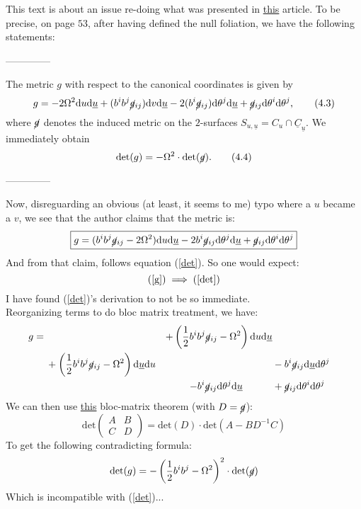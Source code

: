 \documentclass[a4paper,11pt]{article}
\renewcommand{\d}{{\mathrm{d}}}
\begin{document}
This text is about an issue re-doing what was presented in \href{https://web.math.princeton.edu/~aretakis/columbiaGR.pdf}{this} article. To be precise, on page $53$, after having defined the null foliation, we have the following statements:
\begin{center}
    --------------
\end{center}
The metric $g$ with respect to the canonical coordinates is given by
\begin{equation}
    g=-2\Omega^2 \d u \d \underline{u} + (b^ib^j\cancel{g}_{ij})\d v \d \underline{u} - 2(b^i\cancel{g}_{ij})\d\theta^j\d\underline{u}+\cancel{g}_{ij}\d\theta^i\d\theta^j, \tag{4.3}
\end{equation}
where $\cancel{g}$ denotes the induced metric on the $2$-surfaces
$S_{u,\underline{u}}=C_u\cap \underline{C}_{\underline{u}}$. We immediately obtain
\begin{equation}
    \mathrm{det}(g)=-\Omega^2\cdot\mathrm{det}(\cancel{g}).\tag{4.4} \label{det}
\end{equation}
\begin{center}
    --------------
\end{center}

Now, disreguarding an obvious (at least, it seems to me) typo where a $u$ became a $v$, we see that the author claims that the metric is:
\begin{equation}\label{g}
    \boxed{g=(b^ib^j\cancel{g}_{ij}-2\Omega^2) \d u \d \underline{u} - 2b^i\cancel{g}_{ij}\d\theta^j\d\underline{u}+\cancel{g}_{ij}\d\theta^i\d\theta^j}
\end{equation}
And from that claim, follows equation (\ref{det}). So one would expect:
$$(\ref{g})\implies(\ref{det})$$
I have found (\ref{det})'s derivation to not be so immediate.\\
Reorganizing terms to do bloc matrix treatment, we have:
\begin{align*}
    g&= &+\left(\frac{1}{2}b^ib^j\cancel{g}_{ij}-\Omega^2\right)\d u \d \underline{u}\\
    &\quad\;+\left(\frac{1}{2}b^ib^j\cancel{g}_{ij}-\Omega^2\right)\d\underline{u}\d u &&-b^i\cancel{g}_{ij}\d\underline{u}\d\theta^j\\
    &&-b^i\cancel{g}_{ij}\d\theta^j\d\underline{u}\quad\quad\quad&+\cancel{g}_{ij}\d\theta^i\d\theta^j
\end{align*}
We can then use \href{https://en.wikipedia.org/wiki/Block_matrix#Determinant}{this} bloc-matrix theorem (with $D=\cancel{g}$):
\begin{equation}\label{bloc}
    \mathrm{det}\left(\begin{matrix}
        A & B\\
        C & D
    \end{matrix}\right) = \mathrm{det}(D)\cdot\mathrm{det}(A-BD^{-1}C)
\end{equation}
To get the following contradicting formula:
\begin{equation}
    \mathrm{det}(g)=-\left(\frac{1}{2}b^ib^j-\Omega^2\right)^2\cdot\mathrm{det}(\cancel{g})\label{mine}
\end{equation}
Which is incompatible with (\ref{det})...
\end{document}
